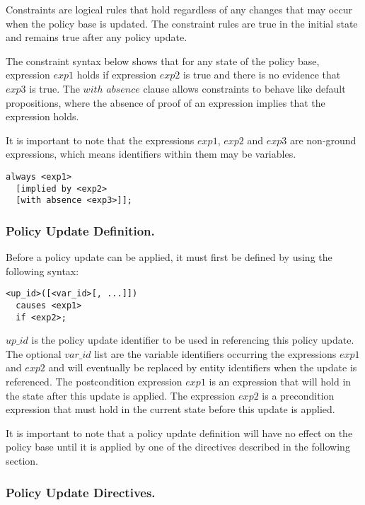 \documentclass[11pt]{llncs}
\begin{document}
        Constraints are logical rules that hold regardless of any changes
        that may occur when the policy base is updated. The constraint rules
        are true in the initial state and remains true after any policy
        update.

        The constraint syntax below shows that for any state of the policy
        base, expression $exp1$ holds if expression $exp2$ is true and there
        is no evidence that $exp3$ is true. The $with$ $absence$ clause
        allows constraints to behave like default propositions, where the
        absence of proof of an expression implies that the expression holds.

        It is important to note that the expressions $exp1$, $exp2$ and
        $exp3$ are non-ground expressions, which means identifiers within
        them may be variables.

        \begin{verbatim}always <exp1>
  [implied by <exp2>
  [with absence <exp3>]];\end{verbatim}

      \subsubsection{Policy Update Definition.}

        Before a policy update can be applied, it must first be defined by
        using the following syntax:

        \begin{verbatim}<up_id>([<var_id>[, ...]])
  causes <exp1>
  if <exp2>;\end{verbatim}

        $up\_id$ is the policy update identifier to be used in referencing
        this policy update. The optional $var\_id$ list are the variable
        identifiers occurring the expressions $exp1$ and $exp2$ and will
        eventually be replaced by entity identifiers when the update is
        referenced. The postcondition expression $exp1$ is an expression that
        will hold in the state after this update is applied. The expression
        $exp2$ is a precondition expression that must hold in the current
        state before this update is applied.

        It is important to note that a policy update definition will have no
        effect on the policy base until it is applied by one of the
        directives described in the following section.

      \subsubsection{Policy Update Directives.}
\end{document}

